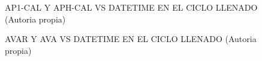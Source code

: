 \begin{figure}[H]
  \hfill
  \hfill
  \hfill
  \caption{AP1-CAL Y APH-CAL VS DATETIME EN EL CICLO LLENADO (Autoria propia)}
  \end{figure}
\begin{figure}[H]
  \hfill
  \hfill
  \hfill
  \caption{AVAR Y AVA VS DATETIME EN EL CICLO LLENADO (Autoria propia)}
  \end{figure}
